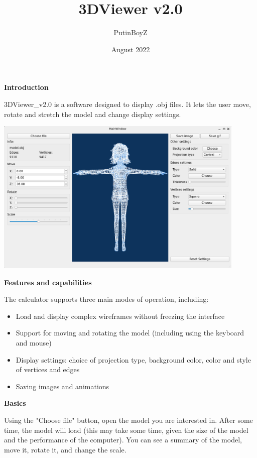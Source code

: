 \documentclass[12pt, letterpaper
]{article}
\title{3DViewer v2.0}
\author{PutinBoyZ}
\date{August 2022}
\begin{document}
\begin{titlepage}
  \maketitle
\end{titlepage}  

\textbf{Introduction}

3DViewer\_v2.0 is a software designed to display .obj files. It lets the
user move, rotate and stretch the model and change display settings.

\includegraphics[width=4.72361in,height=2.94722in]{vertopal_4bce193b52fb40a8bfdc292270c39a64/media/image1.png}

\textbf{Features and capabilities}

The calculator supports three main modes of operation, including:

\begin{itemize}
\item
  Load and display complex wireframes without freezing the interface
\item
  Support for moving and rotating the model (including using the
  keyboard and mouse)
\item
  Display settings: choice of projection type, background color, color
  and style of vertices and edges
\item
  Saving images and animations
\end{itemize}

\textbf{Basics}

Using the "Choose file" button, open the model you are interested in.
After some time, the model will load (this may take some time, given the
size of the model and the performance of the computer). You can see a
summary of the model, move it, rotate it, and change the scale.
\end{document}
